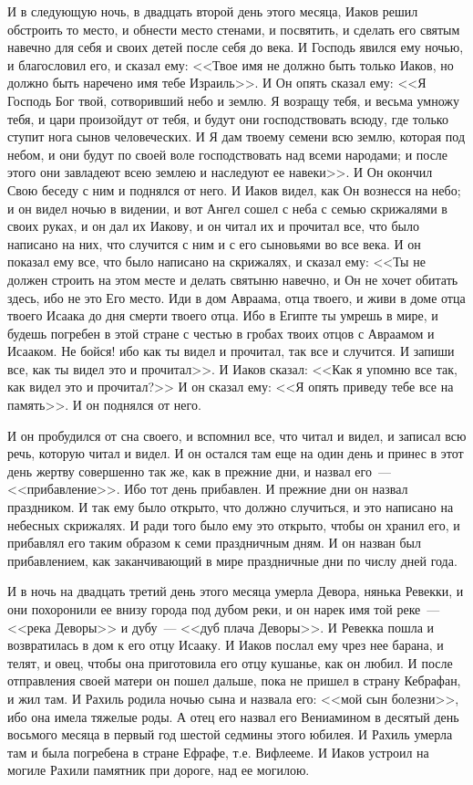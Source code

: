 И в следующую ночь, в двадцать второй день этого
месяца, Иаков решил обстроить то место, и обнести
место стенами, и посвятить, и сделать его святым
навечно для себя и своих детей после себя до века.
И Господь явился ему ночью, и благословил его, и
сказал ему: <<Твое имя не должно быть только
Иаков, но должно быть наречено имя тебе
Израиль>>. И Он опять сказал ему: <<Я Господь
Бог твой, сотворивший небо и землю. Я возращу
тебя, и весьма умножу тебя, и цари произойдут от
тебя, и будут они господствовать всюду, где
только ступит нога сынов человеческих. И Я дам
твоему семени всю землю, которая под небом, и они
будут по своей воле господствовать над всеми
народами; и после этого они завладеют всею землею
и наследуют ее навеки>>. И Он окончил Свою
беседу с ним и поднялся от него. И Иаков видел, как
Он вознесся на небо; и он видел ночью в видении, и
вот Ангел сошел с неба с семью скрижалями в своих
руках, и он дал их Иакову, и он читал их и прочитал
все, что было написано на них, что случится с ним и
с его сыновьями во все века. И он показал ему все,
что было написано на скрижалях, и сказал ему:
<<Ты не должен строить на этом месте и делать
святыню навечно, и Он не хочет обитать здесь, ибо
не это Его место. Иди в дом Авраама, отца
твоего, и живи в доме отца твоего Исаака до дня
смерти твоего отца. Ибо в Египте ты умрешь в мире,
и будешь погребен в этой стране с честью в гробах
твоих отцов с Авраамом и Исааком. Не бойся! ибо
как ты видел и прочитал, так все и случится. И
запиши все, как ты видел это и прочитал>>. И
Иаков сказал: <<Как я упомню все так, как видел
это и прочитал?>> И он сказал ему: <<Я опять
приведу тебе все на память>>. И он поднялся от
него.

И он пробудился от сна своего, и вспомнил все,
что читал и видел, и записал всю речь, которую
читал и видел. И он остался там еще на один день и
принес в этот день жертву совершенно так же, как в
прежние дни, и назвал его~--- <<прибавление>>. Ибо
тот день прибавлен. И прежние дни он назвал
праздником. И так ему было открыто, что должно
случиться, и это написано на небесных скрижалях.
И ради того было ему это открыто, чтобы он хранил
его, и прибавлял его таким образом к семи
праздничным дням. И он назван был прибавлением,
как заканчивающий в мире праздничные дни по
числу дней года.

И в ночь на двадцать третий день этого месяца
умерла Девора, нянька Ревекки, и они похоронили
ее внизу города под дубом реки, и он нарек имя той
реке~--- <<река Деворы>> и дубу~--- <<дуб плача
Деворы>>. И Ревекка пошла и возвратилась в дом к
его отцу Исааку. И Иаков послал ему чрез нее
барана, и телят, и овец, чтобы она приготовила его
отцу кушанье, как он любил. И после отправления своей
матери он пошел дальше, пока не пришел в страну
Кебрафан, и жил там. И Рахиль родила ночью сына и
назвала его: <<мой сын болезни>>, ибо она имела
тяжелые роды. А отец его назвал его Вениамином в
десятый день восьмого месяца в первый год шестой
седмины этого юбилея. И Рахиль умерла там и была
погребена в стране Ефрафе, т.е. Вифлееме. И Иаков
устроил на могиле Рахили памятник при дороге, над
ее могилою.

